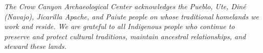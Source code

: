 \documentclass[letterpaper,11pt]{letter}
\begin{document}
\begin{letter}{}
\emph{The Crow Canyon Archaeological Center acknowledges the Pueblo, Ute, Diné (Navajo), Jicarilla Apache, and Paiute people on whose traditional homelands we work and reside. We are grateful to all Indigenous people who continue to preserve and protect cultural traditions, maintain ancestral relationships, and steward these lands.}

\vspace{0.5in}


\end{letter}
\end{document}
